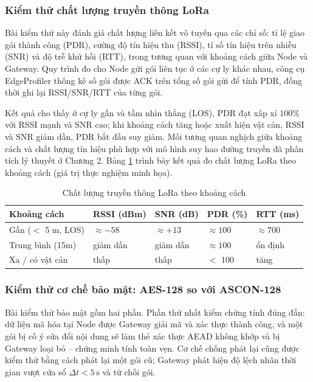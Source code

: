 \subsubsection{Kiểm thử chất lượng truyền thông LoRa}
Bài kiểm thử này đánh giá chất lượng liên kết vô tuyến qua các chỉ số: tỉ lệ giao gói thành công (PDR), cường độ tín hiệu thu (RSSI), tỉ số tín hiệu trên nhiễu (SNR) và độ trễ khứ hồi (RTT), trong tương quan với khoảng cách giữa Node và Gateway. Quy trình đo cho Node gửi gói liên tục ở các cự ly khác nhau, công cụ EdgeProfiler thống kê số gói được ACK trên tổng số gói gửi để tính PDR, đồng thời ghi lại RSSI/SNR/RTT của từng gói.

Kết quả cho thấy ở cự ly gần và tầm nhìn thẳng (LOS), PDR đạt xấp xỉ $100\%$ với RSSI mạnh và SNR cao; khi khoảng cách tăng hoặc xuất hiện vật cản, RSSI và SNR giảm dần, PDR bắt đầu suy giảm. Mối tương quan nghịch giữa khoảng cách và chất lượng tín hiệu phù hợp với mô hình suy hao đường truyền đã phân tích lý thuyết ở Chương 2. Bảng \ref{Bảng 5.4} trình bày kết quả đo chất lượng LoRa theo khoảng cách (giá trị thực nghiệm minh họa).

\begin{table}[H]
\centering
\caption{Chất lượng truyền thông LoRa theo khoảng cách}
\label{Bảng 5.4}
\renewcommand{\arraystretch}{1.4}
\begin{tabular}{p{4.0cm} p{2.4cm} p{2.4cm} p{2.0cm} p{2.2cm}}
\hline
\textbf{Khoảng cách} & \textbf{RSSI (dBm)} & \textbf{SNR (dB)} & \textbf{PDR (\%)} & \textbf{RTT (ms)} \\ \hline
Gần ($<$ 5 m, LOS) & $\approx -58$ & $\approx +13$ & $\approx 100$ & $\approx 700$ \\ 
Trung bình (15m) & giảm dần & giảm dần & $\approx 100$ & ổn định \\ 
Xa / có vật cản & thấp & thấp & $<$ 100 & tăng \\ \hline
\end{tabular}
\end{table}


\subsubsection{Kiểm thử cơ chế bảo mật: AES-128 so với ASCON-128}
Bài kiểm thử bảo mật gồm hai phần. Phần thứ nhất kiểm chứng tính đúng đắn: dữ liệu mã hóa tại Node được Gateway giải mã và xác thực thành công, và một gói bị cố ý sửa đổi nội dung sẽ làm thẻ xác thực AEAD không khớp và bị Gateway loại bỏ -- chứng minh tính toàn vẹn. Cơ chế chống phát lại cũng được kiểm thử bằng cách phát lại một gói cũ; Gateway phát hiện độ lệch nhãn thời gian vượt cửa sổ $\Delta t < 5\,\text{s}$ và từ chối gói.

